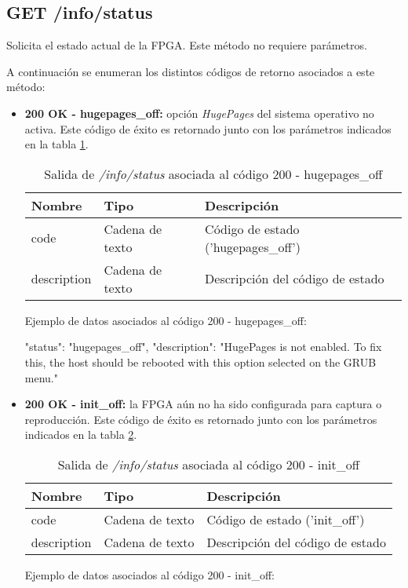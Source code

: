 %
%
\subsection{GET /info/status}
Solicita el estado actual de la \gls{FPGA}. Este método no requiere parámetros.

A continuación se enumeran los distintos códigos de retorno asociados a este método:
\begin{itemize}

\item{\textbf{200 OK - hugepages\_off:} opción \textit{HugePages} del sistema operativo no activa. Este código de éxito es retornado junto con los parámetros indicados en la tabla \ref{extra:api:infostatus:hugepagesoff}.
\begin{table}[H]
\centering
\begin{tabular}{|l|l|l|}
\hline
\rowcolor[HTML]{F5F5F5}
\textbf{Nombre}  & \textbf{Tipo}   & \textbf{Descripción}               \\ \hline
code             & Cadena de texto & Código de estado ('hugepages\_off') \\ \hline
description      & Cadena de texto & Descripción del código de estado   \\ \hline
\end{tabular}
\caption{Salida de \textit{/info/status} asociada al código 200 - hugepages\_off}
\label{extra:api:infostatus:hugepagesoff}
\end{table}
\begin{minipage}{\textwidth}
Ejemplo de datos asociados al código 200 - hugepages\_off:

\begin{code}[language=json]
{
  "status": "hugepages_off",
  "description": "HugePages is not enabled. To fix this, the host should be rebooted with this option selected on the GRUB menu."
}
\end{code}
\end{minipage}
}

\item{\textbf{200 OK - init\_off:} la \gls{FPGA} aún no ha sido configurada para captura o reproducción. Este código de éxito es retornado junto con los parámetros indicados en la tabla \ref{extra:api:infostatus:initoff}.
\begin{table}[H]
\centering
\begin{tabular}{|l|l|l|}
\hline
\rowcolor[HTML]{F5F5F5}
\textbf{Nombre}  & \textbf{Tipo}   & \textbf{Descripción}               \\ \hline
code             & Cadena de texto & Código de estado ('init\_off')     \\ \hline
description      & Cadena de texto & Descripción del código de estado   \\ \hline
\end{tabular}
\caption{Salida de \textit{/info/status} asociada al código 200 - init\_off}
\label{extra:api:infostatus:initoff}
\end{table}
\begin{minipage}{\textwidth}
Ejemplo de datos asociados al código 200 - init\_off:


\end{minipage}}
\end{itemize}
